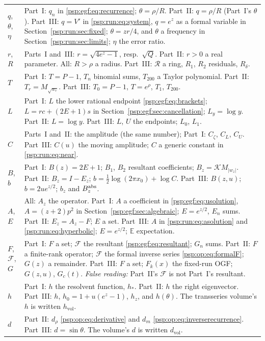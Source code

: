 \documentclass[11pt,letterpaper]{article}
\numberwithin{equation}{section}
\theoremstyle{remark}\newtheorem{remark}[theorem]{Remark}
\newcommand{\EE}{\mathbb E}
\newcommand{\vol}{\mathrm{vol}}
\begin{document}
\begin{longtable}{@{}>{\raggedright\arraybackslash}p{} >{\raggedright\arraybackslash}p{}@{}}
$q$, $\theta$, $\eta$ & Part~I: $q_n$ in \eqref{psp:egf:eq:recurrence}; $\theta=\rho/R$. Part~II: $q=\rho/R$ (Part~I's $\theta$). Part~III: $q=V'$ in \eqref{psp:run:eq:system}, $q=e^z$ as a formal variable in Section~\ref{psp:run:sec:fixed}; $\theta=zr/4$, and $\theta$ a frequency in Section~\ref{psp:run:sec:limits}; $\eta$ the error ratio.\\
$r$, $R$ & Parts~I and~III: $r=\sqrt{4e^z-1}$, resp.\ $\sqrt Q$. Part~II: $r>0$ a real parameter. All: $R>\rho$ a radius. Part~III: $\mathcal R$ a ring, $R_1$, $R_2$ residuals, $R_\delta$.\\
$T$ & Part~I: $T=P-1$, $T_n$ binomial sums, $T_{200}$ a Taylor polynomial. Part~II: $T_r=M_{\sqrt{w_r}}$. Part~III: $T_0=P-1$, $T=e^\rho$, $T_1$, $T_{200}$.\\
$L$ & Part~I: $L$ the lower rational endpoint \eqref{psp:egf:eq:brackets}; $L=rc+(2E+1)s$ in Section~\ref{psp:egf:sec:cancellation}; $L_y=\log y$. Part~II: $L=\log y$. Part~III: $L$, $U$ the endpoints; $L_0$, $L_1$.\\
$C$ & Parts~I and~II: the amplitude (the same number); Part~I: $C_\zeta$, $C_L$, $C_U$. Part~III: $C(u)$ the moving amplitude; $C$ a generic constant in \eqref{psp:run:eq:near}.\\
$B$, $b$ & Part~I: $B(z)=2E+1$; $B_1$, $B_2$ resultant coefficients; $B_z=\mathcal KM_{|w_z|}$. Part~II: $B_z=I-E_z$; $b=\frac12\log(2\pi x_0)+\log C$. Part~III: $B(z,u)$; $b=2ue^{z/2}$; $b_z$ and $B_z^{\rm abs}$.\\
$A$, $E$ & All: $A_z$ the operator. Part~I: $A$ a coefficient in \eqref{psp:egf:eq:usolution}, $A=(z+2)p^2$ in Section~\ref{psp:egf:sec:algebraic}; $E=e^{z/2}$, $E_n$ sums. Part~II: $E_z=A_z-F$; $E$ a set. Part~III: $A$ in \eqref{psp:run:eq:asolution} and \eqref{psp:run:eq:hyperbolic}; $E=e^{z/2}$; $\EE$ expectation.\\
$F$, $\mathcal F$, $G$ & Part~I: $F$ a set; $\mathcal F$ the resultant \eqref{psp:egf:eq:resultant}; $G_n$ sums. Part~II: $F$ a finite-rank operator; $\mathcal F$ the formal inverse series \eqref{psp:op:eq:formalF}; $G(z)$ a remainder. Part~III: $F$ a set; $F_k(x)$ the fixed-run OGF; $G(z,u)$, $G_c(t)$. \emph{False reading:} Part~II's $\mathcal F$ is not Part~I's resultant.\\
$h$ & Part~I: $h$ the resolvent function, $h_*$. Part~II: $h$ the right eigenvector. Part~III: $h$, $h_0=1+u(e^z-1)$, $h_z$, and $h(\theta)$. The transseries volume's $h$ is written $h_\vol$.\\
$d$ & Part~II: $d_\rho$ \eqref{psp:op:eq:derivative} and $d_m$ \eqref{psp:op:eq:inverserecurrence}. Part~III: $d=\sin\theta$. The volume's $d$ is written $d_\vol$.\\

\end{longtable}
\end{document}
